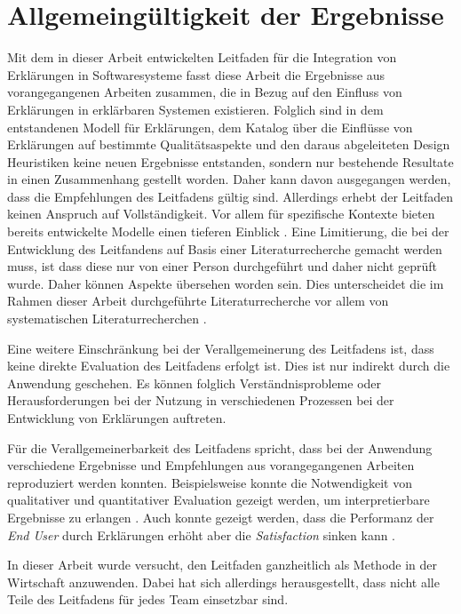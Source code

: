 \section{Allgemeingültigkeit der Ergebnisse}

Mit dem in dieser Arbeit entwickelten Leitfaden für die Integration von Erklärungen in Softwaresysteme fasst diese Arbeit die Ergebnisse aus vorangegangenen Arbeiten zusammen, die in Bezug auf den Einfluss von Erklärungen in erklärbaren Systemen existieren. Folglich sind in dem entstandenen Modell für Erklärungen, dem Katalog über die Einflüsse von Erklärungen auf bestimmte Qualitätsaspekte und den daraus abgeleiteten Design Heuristiken keine neuen Ergebnisse entstanden, sondern nur bestehende Resultate in einen Zusammenhang gestellt worden. Daher kann davon ausgegangen werden, dass die Empfehlungen des Leitfadens gültig sind. Allerdings erhebt der Leitfaden keinen Anspruch auf Vollständigkeit. Vor allem für spezifische Kontexte bieten bereits entwickelte Modelle einen tieferen Einblick \cite{nunes_systematic_2017, sokol_explainability_2020}. Eine Limitierung, die bei der Entwicklung des Leitfandens auf Basis einer Literaturrecherche gemacht werden muss, ist dass diese nur von einer Person durchgeführt und daher nicht geprüft wurde. Daher können Aspekte übersehen worden sein. Dies unterscheidet die im Rahmen dieser Arbeit durchgeführte Literaturrecherche vor allem von systematischen Literaturrecherchen \cite[vgl.][]{nunes_systematic_2017,chazette_knowledge_nodate}.

Eine weitere Einschränkung bei der Verallgemeinerung des Leitfadens ist, dass keine direkte Evaluation des Leitfadens erfolgt ist. Dies ist nur indirekt durch die Anwendung geschehen. Es können folglich Verständnisprobleme oder Herausforderungen bei der Nutzung in verschiedenen Prozessen bei der Entwicklung von Erklärungen auftreten.

Für die Verallgemeinerbarkeit des Leitfadens spricht, dass bei der Anwendung verschiedene Ergebnisse und Empfehlungen aus vorangegangenen Arbeiten reproduziert werden konnten. Beispielsweise konnte die Notwendigkeit von qualitativer und quantitativer Evaluation gezeigt werden, um interpretierbare Ergebnisse zu erlangen \cite{}. Auch konnte gezeigt werden, dass die Performanz der \textit{End User} durch Erklärungen erhöht aber die \textit{Satisfaction} sinken kann \cite{}. 

\smallskip

In dieser Arbeit wurde versucht, den Leitfaden ganzheitlich als Methode in der Wirtschaft anzuwenden. Dabei hat sich allerdings herausgestellt, dass nicht alle Teile des Leitfadens für jedes Team einsetzbar sind.

